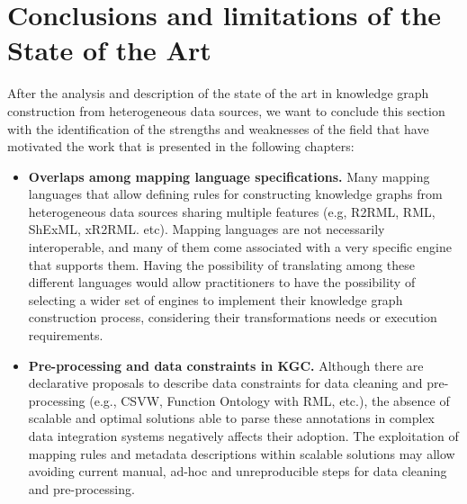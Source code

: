 \section{Conclusions and limitations of the State of the Art}
\label{sec:soa_conclusions}
After the analysis and description of the state of the art in knowledge graph construction from heterogeneous data sources, we want to conclude this section with the identification of the strengths and weaknesses of the field that have motivated the work that is presented in the following chapters:
\begin{itemize}
    \item \textbf{Overlaps among mapping language specifications.} Many mapping languages that allow defining rules for constructing knowledge graphs from heterogeneous data sources sharing multiple features (e.g, R2RML, RML, ShExML, xR2RML. etc). Mapping languages are not necessarily interoperable, and many of them come associated with a very specific engine that supports them. Having the possibility of translating among these different languages would allow practitioners to have the possibility of selecting a wider set of engines to implement their knowledge graph construction process, considering their transformations needs or execution requirements.
    \item \textbf{Pre-processing and data constraints in KGC.} Although there are declarative proposals to describe data constraints for data cleaning and pre-processing (e.g., CSVW, Function Ontology with RML, etc.), the absence of scalable and optimal solutions able to parse these annotations in complex data integration systems negatively affects their adoption. The exploitation of mapping rules and metadata descriptions within scalable solutions may allow avoiding current manual, ad-hoc and unreproducible steps for data cleaning and pre-processing.  

\end{itemize}
